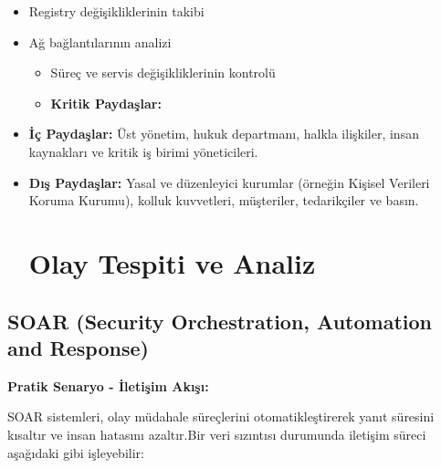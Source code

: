 \begin{itemize}
\begin{itemize}
        \item Registry değişikliklerinin takibi

        \item Ağ bağlantılarının analizi\begin{itemize}

        \item Süreç ve servis değişikliklerinin kontrolü    \item \textbf{Kritik Paydaşlar:}

    \end{itemize}    \begin{itemize}

\end{itemize}        \item \textbf{İç Paydaşlar:} Üst yönetim, hukuk departmanı, halkla ilişkiler, insan kaynakları ve kritik iş birimi yöneticileri.

        \item \textbf{Dış Paydaşlar:} Yasal ve düzenleyici kurumlar (örneğin Kişisel Verileri Koruma Kurumu), kolluk kuvvetleri, müşteriler, tedarikçiler ve basın.

\section{Olay Tespiti ve Analiz}    \end{itemize}

\end{itemize}

\subsection{SOAR (Security Orchestration, Automation and Response)}\textbf{Pratik Senaryo - İletişim Akışı:}

SOAR sistemleri, olay müdahale süreçlerini otomatikleştirerek yanıt süresini kısaltır ve insan hatasını azaltır.Bir veri sızıntısı durumunda iletişim süreci aşağıdaki gibi işleyebilir:

